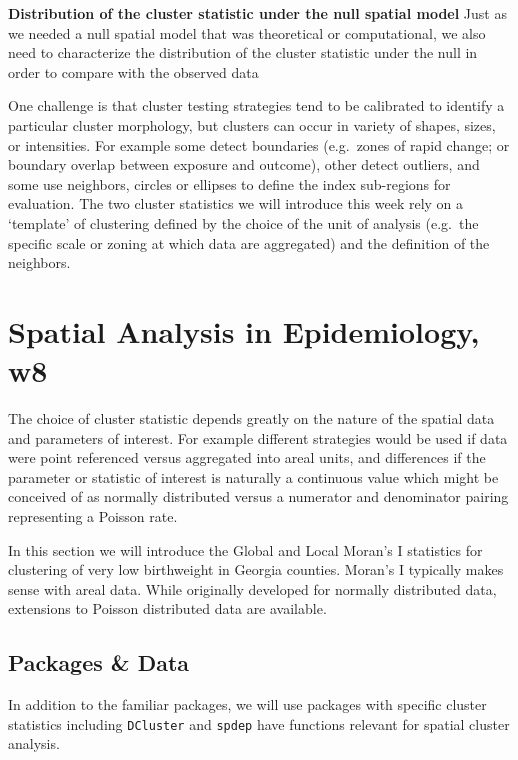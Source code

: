 \documentclass[
]{book}
\newcommand{\passthrough}[1]{#1}
\begin{document}
\textbf{Distribution of the cluster statistic under the null spatial model} Just as we needed a null spatial model that was theoretical or computational, we also need to characterize the distribution of the cluster statistic under the null in order to compare with the observed data

One challenge is that cluster testing strategies tend to be calibrated to identify a particular cluster morphology, but clusters can occur in variety of shapes, sizes, or intensities. For example some detect boundaries (e.g.~zones of rapid change; or boundary overlap between exposure and outcome), other detect outliers, and some use neighbors, circles or ellipses to define the index sub-regions for evaluation. The two cluster statistics we will introduce this week rely on a `template' of clustering defined by the choice of the unit of analysis (e.g.~the specific scale or zoning at which data are aggregated) and the definition of the neighbors.

\hypertarget{spatial-analysis-in-epidemiology-w8}{%
\section{Spatial Analysis in Epidemiology, w8}\label{spatial-analysis-in-epidemiology-w8}}

The choice of cluster statistic depends greatly on the nature of the spatial data and parameters of interest. For example different strategies would be used if data were point referenced versus aggregated into areal units, and differences if the parameter or statistic of interest is naturally a continuous value which might be conceived of as normally distributed versus a numerator and denominator pairing representing a Poisson rate.

In this section we will introduce the Global and Local Moran's I statistics for clustering of very low birthweight in Georgia counties. Moran's I typically makes sense with areal data. While originally developed for normally distributed data, extensions to Poisson distributed data are available.

\hypertarget{packages-data}{%
\subsection{Packages \& Data}\label{packages-data}}

In addition to the familiar packages, we will use packages with specific cluster statistics including \passthrough{\lstinline!DCluster!} and \passthrough{\lstinline!spdep!} have functions relevant for spatial cluster analysis.
\end{document}
